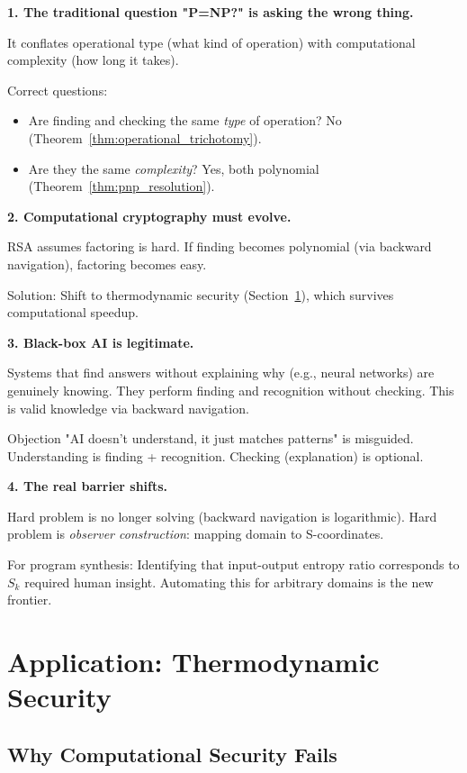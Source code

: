 \documentclass[twocolumn,10pt]{article}
\theoremstyle{definition}
\theoremstyle{remark}
\newcommand{\Sk}{S_k}
\begin{document}
\textbf{1. The traditional question "P=NP?" is asking the wrong thing.}

It conflates operational type (what kind of operation) with computational complexity (how long it takes).

Correct questions:
\begin{itemize}
\item Are finding and checking the same \textit{type} of operation? No (Theorem~\ref{thm:operational_trichotomy}).
\item Are they the same \textit{complexity}? Yes, both polynomial (Theorem~\ref{thm:pnp_resolution}).
\end{itemize}

\vspace{0.2cm}
\noindent\textbf{2. Computational cryptography must evolve.}

RSA assumes factoring is hard. If finding becomes polynomial (via backward navigation), factoring becomes easy.

Solution: Shift to thermodynamic security (Section~\ref{sec:security}), which survives computational speedup.

\vspace{0.2cm}
\noindent\textbf{3. Black-box AI is legitimate.}

Systems that find answers without explaining why (e.g., neural networks) are genuinely knowing. They perform finding and recognition without checking. This is valid knowledge via backward navigation.

Objection "AI doesn't understand, it just matches patterns" is misguided. Understanding is finding + recognition. Checking (explanation) is optional.

\vspace{0.2cm}
\noindent\textbf{4. The real barrier shifts.}

Hard problem is no longer solving (backward navigation is logarithmic). Hard problem is \textit{observer construction}: mapping domain to S-coordinates.

For program synthesis: Identifying that input-output entropy ratio corresponds to $\Sk$ required human insight. Automating this for arbitrary domains is the new frontier.

\section{Application: Thermodynamic Security}
\label{sec:security}

\subsection{Why Computational Security Fails}
\end{document}
